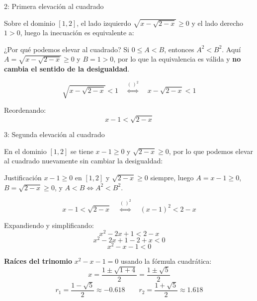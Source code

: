 \documentclass[letterpaper, 12pt]{article}
\begin{document}
\bigskip

\begin{paso}{2: Primera elevación al cuadrado}

Sobre el dominio $[1,2]$, el lado izquierdo $\sqrt{x-\sqrt{2-x}} \geq 0$
y el lado derecho $1 > 0$, luego la inecuación es equivalente a:

\begin{justif}{¿Por qué podemos elevar al cuadrado?}
    Si $0 \leq A < B$, entonces $A^2 < B^2$. Aquí $A = \sqrt{x-\sqrt{2-x}}
    \geq 0$ y $B = 1 > 0$, por lo que la equivalencia es válida y
    \textbf{no cambia el sentido de la desigualdad}.
\end{justif}

\[
    \sqrt{x - \sqrt{2-x}} < 1 \quad\stackrel{(\,)^2}{\Longleftrightarrow}\quad
    x - \sqrt{2-x} < 1
\]

Reordenando:
\[
    \boxed{x - 1 < \sqrt{2-x}}
\]

\end{paso}

\bigskip

\begin{paso}{3: Segunda elevación al cuadrado}

En el dominio $[1,2]$ se tiene $x - 1 \geq 0$ y $\sqrt{2-x} \geq 0$,
por lo que podemos elevar al cuadrado nuevamente sin cambiar la desigualdad:

\begin{justif}{Justificación}
    $x-1 \geq 0$ en $[1,2]$ y $\sqrt{2-x}\geq 0$ siempre, luego
    $A = x-1 \geq 0$, $B = \sqrt{2-x} \geq 0$, y $A < B
    \Leftrightarrow A^2 < B^2$.
\end{justif}

\[
    x - 1 < \sqrt{2-x} \quad\stackrel{(\,)^2}{\Longleftrightarrow}\quad
    (x-1)^2 < 2-x
\]

Expandiendo y simplificando:
\[
    x^2 - 2x + 1 < 2 - x
\]
\[
    x^2 - 2x + 1 - 2 + x < 0
\]
\[
    \boxed{x^2 - x - 1 < 0}
\]

\textbf{Raíces del trinomio} $x^2 - x - 1 = 0$ usando la fórmula cuadrática:
\[
    x = \frac{1 \pm \sqrt{1 + 4}}{2} = \frac{1 \pm \sqrt{5}}{2}
\]
\[
    r_1 = \frac{1 - \sqrt{5}}{2} \approx -0.618 \qquad
    r_2 = \frac{1 + \sqrt{5}}{2} \approx 1.618
\]

\end{paso}
\end{document}
